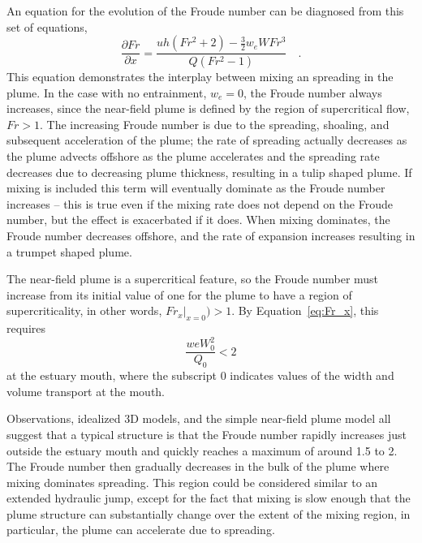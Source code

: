\documentclass[12pt]{article}
\begin{document}
{An equation for the evolution of the Froude number can be diagnosed from this set of equations, 
\begin{equation}
\frac{\partial Fr}{\partial x} = \frac{ u h (Fr^2+2) - \frac{3}{2} w_e W  Fr^3}{ Q (Fr^2-1)} \quad .
\label{eq:Fr_x}
\end{equation}
This equation demonstrates the interplay between mixing an spreading in the plume. In the case with no entrainment, $w_e = 0$, the Froude number always increases, since the near-field plume is defined by the region of supercritical flow, $Fr>1$. The increasing Froude number is due to the spreading, shoaling, and subsequent acceleration of the plume; the rate of spreading actually decreases as the plume advects offshore as the plume accelerates and the spreading rate decreases due to decreasing plume thickness, resulting in a tulip shaped plume. If mixing is included this term will eventually dominate as the Froude number increases -- this is true even if the mixing rate does not depend on the Froude number, but the effect is exacerbated if it does. When mixing dominates, the Froude number decreases offshore, and the rate of expansion increases resulting in a trumpet shaped plume. 

The near-field plume is a supercritical feature, so the Froude number must increase from its initial value of one for the plume to have a region of supercriticality, in other words, $Fr_x|_{x=0}) > 1$. By Equation~\ref{eq:Fr_x}, this requires
\begin{equation}
    \frac{we W_0^2}{Q_0} < 2
    \label{eq:criticality}
\end{equation}
at the estuary mouth, where the subscript $0$ indicates values of the width and volume transport at the mouth.

Observations, idealized 3D models, and the simple near-field plume model all suggest that a typical structure is that the Froude number rapidly increases just outside the estuary mouth and quickly reaches a maximum of around 1.5 to 2. The Froude number then gradually decreases in the bulk of the plume where mixing dominates spreading. This region could be considered similar to an extended hydraulic jump, except for the fact that mixing is slow enough that the plume structure can substantially change over the extent of the mixing region, in particular, the plume can accelerate due to spreading.

}
\end{document}
